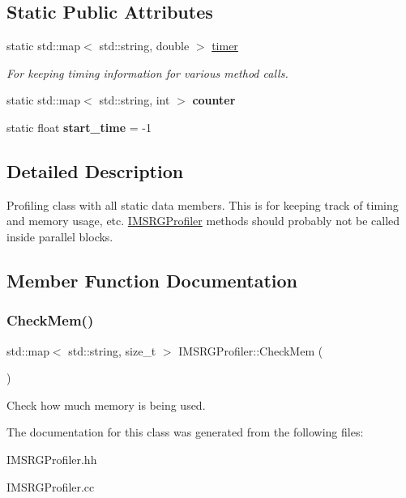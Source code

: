 \subsection*{Static Public Attributes}
\begin{DoxyCompactItemize}
\item 
\mbox{\label{classIMSRGProfiler_a69846573d747a471b292ecff83e37e34}} 
static std\+::map$<$ std\+::string, double $>$ \hyperlink{classIMSRGProfiler_a69846573d747a471b292ecff83e37e34}{timer}
\begin{DoxyCompactList}\small\item\em For keeping timing information for various method calls. \end{DoxyCompactList}\item 
\mbox{\label{classIMSRGProfiler_a938be5dfc5c7d7c49a4a5a2ebc273370}} 
static std\+::map$<$ std\+::string, int $>$ {\bfseries counter}
\item 
\mbox{\label{classIMSRGProfiler_a18fe647ec85027abc51047437c0c1540}} 
static float {\bfseries start\+\_\+time} = -\/1
\end{DoxyCompactItemize}


\subsection{Detailed Description}
Profiling class with all static data members. This is for keeping track of timing and memory usage, etc. \hyperlink{classIMSRGProfiler}{I\+M\+S\+R\+G\+Profiler} methods should probably not be called inside parallel blocks. 

\subsection{Member Function Documentation}
\mbox{\label{classIMSRGProfiler_a4a86bec6848acb4af9d7ea273ed74db2}} 
\subsubsection{\texorpdfstring{Check\+Mem()}{CheckMem()}}
{\footnotesize\ttfamily std\+::map$<$ std\+::string, size\+\_\+t $>$ I\+M\+S\+R\+G\+Profiler\+::\+Check\+Mem (\begin{DoxyParamCaption}{ }\end{DoxyParamCaption})}

Check how much memory is being used. 

The documentation for this class was generated from the following files\+:\begin{DoxyCompactItemize}
\item 
I\+M\+S\+R\+G\+Profiler.\+hh\item 
I\+M\+S\+R\+G\+Profiler.\+cc\end{DoxyCompactItemize}
